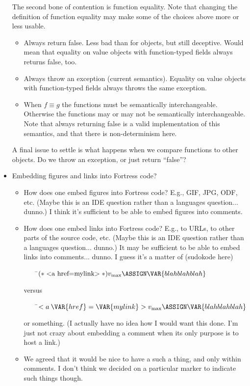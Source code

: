 \begin{itemize}
\begin{itemize}
  \end{itemize}
  The second bone of contention is function equality.  Note that changing the definition of function equality may make some of the choices above more or less usable.
  \begin{itemize}
     \item Always return false.  Less bad than for objects, but still deceptive.  Would mean that equality on value objects with function-typed fields always returns false, too.
     \item Always throw an exception (current semantics).  Equality on value objects with function-typed fields always throws the same exception.
     \item When $f\equiv g$ the functions must be semantically interchangeable.  Otherwise the functions may or may not be semantically interchangeable.  Note that always returning false is a valid implementation of this semantics, and that there is non-determinism here.
  \end{itemize}
A final issue to settle is what happens when we compare functions to other objects.  Do we throw an exception, or just return ``false''?

\item Embedding figures and links into Fortress code?
 \begin{itemize}
 \item
How does one embed figures into Fortress code? E.g., GIF, JPG, ODF, etc. (Maybe this is an IDE question rather than a languages question... dunno.) I think it's sufficient to be able to embed figures into comments.
 \item
How does one embed links into Fortress code? E.g., to URLs, to other parts of the source code, etc. (Maybe this is an IDE question rather than a languages question... dunno.) It may be sufficient to be able to embed links into comments... dunno. I guess it's a matter of (sudokode here)
\begin{Fortress}
{\tt~~~~}\pushtabs\=\+\(    \mathtt{(*}\;\hbox{\rm  <a href=mylink> \unskip}\;\mathtt{*)} v_{\mathrm{max}} \ASSIGN \VAR{blahblahblah}\)\-\\\poptabs
\end{Fortress}
versus
\begin{Fortress}
{\tt~~~~}\pushtabs\=\+\(    <a\:\VAR{href}=\VAR{mylink}> v_{\mathrm{max}} \ASSIGN \VAR{blahblahblah}\)\-\\\poptabs
\end{Fortress}
or something. (I actually have no idea how I would want this done. I'm just not crazy about embedding a comment when its only purpose is to host a link.)
 \item
We agreed that it would be nice to have a such a thing, and only within comments. I don't think we decided on a particular marker to indicate such things though.
 \end{itemize}


\end{itemize}

